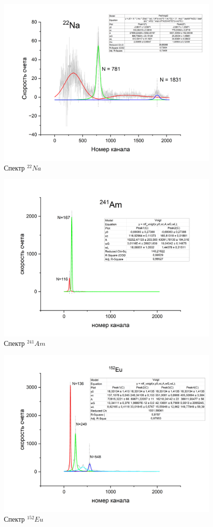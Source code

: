 \documentclass[a4paper,12pt]{article} %
\begin{document}
\begin{figure}[h!]
    \centering
    \includegraphics[scale=0.5]{na.png}
    \caption{Спектр $^{22}Na$}
\end{figure}

\begin{figure}[h!]
    \centering
    \includegraphics[scale=0.5]{am.png}
    \caption{Спектр $^{241}Am$}
\end{figure}


\begin{figure}[h!]
    \centering
    \includegraphics[scale=0.5]{eu.png}
    \caption{Спектр $^{152}Eu$}
\end{figure}
\end{document}
